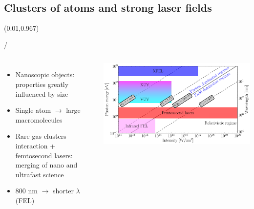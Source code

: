 \documentclass{beamer}
\makeatletter
\newcommand{\framenumber}{
\begin{textblock}{0}(0.01,0.967)
\begin{scriptsize}
{\color{gray}\insertframenumber/\inserttotalframenumber}
\end{scriptsize}
\end{textblock}
}
\makeatother
\begin{document}
\subsection{Clusters of atoms and strong laser fields}
\begin{frame}{}\framenumber
	\begin{columns}
		\begin{itemize}
		\item Nanoscopic objects: properties greatly influenced by size
		\item Single atom $\rightarrow$ large macromolecules
		\item Rare gas clusters interaction + femtosecond lasers: merging of nano and ultrafast science
		\item 800 nm $\rightarrow$ shorter $\lambda$ (FEL)
		\end{itemize}
		\includegraphics[width=1.1\textwidth]{../figures/regimes}
	\end{columns}
\end{frame}
\end{document}
